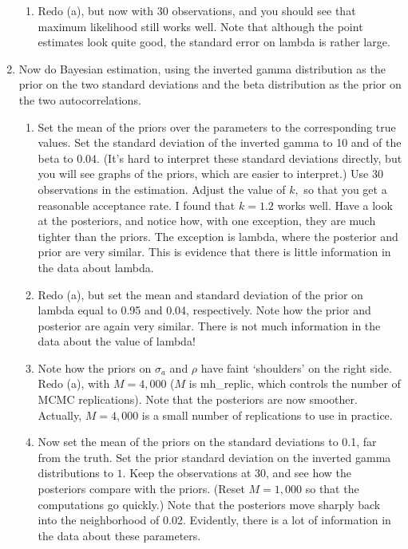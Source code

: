 \begin{enumerate}
\begin{enumerate}
\item Redo (a), but now with 30 observations, and you should see that
maximum likelihood still works well. Note that although the point estimates
look quite good, the standard error on lambda is rather large.
\end{enumerate}

\item Now do Bayesian estimation, using the inverted gamma distribution as
the prior on the two standard deviations and the beta distribution as the
prior on the two autocorrelations.

\begin{enumerate}
\item Set the mean of the priors over the parameters to the corresponding
true values. Set the standard deviation of the inverted gamma to 10 and of
the beta to 0.04. (It's hard to interpret these standard deviations
directly, but you will see graphs of the priors, which are easier to
interpret.) Use 30 observations in the estimation. Adjust the value of $k,$
so that you get a reasonable acceptance rate. I found that $k=1.2$ works
well. Have a look at the posteriors, and notice how, with one exception,
they are much tighter than the priors. The exception is lambda, where the
posterior and prior are very similar. This is evidence that there is little
information in the data about lambda.

\item Redo (a), but set the mean and standard deviation of the prior on
lambda equal to 0.95 and 0.04, respectively. Note how the prior and
posterior are again very similar. There is not much information in the data
about the value of lambda!

\item Note how the priors on $\sigma _{a}$ and $\rho $ have faint
`shoulders' on the right side. Redo (a), with $M=4,000$ ($M$ is mh\_replic,
which controls the number of MCMC replications). Note that the posteriors
are now smoother. Actually, $M=4,000$ is a small number of replications to
use in practice.

\item Now set the mean of the priors on the standard deviations to 0.1, far
from the truth. Set the prior standard deviation on the inverted gamma
distributions to $1$. Keep the observations at 30, and see how the
posteriors compare with the priors. (Reset $M=1,000$ so that the
computations go quickly.) Note that the posteriors move sharply back into
the neighborhood of 0.02. Evidently, there is a lot of information in the
data about these parameters.


\end{enumerate}
\end{enumerate}
